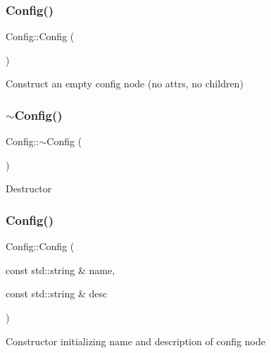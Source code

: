 \subsubsection{\texorpdfstring{Config()}{Config()}\hspace{0.1cm}{\footnotesize\ttfamily [1/2]}}
{\footnotesize\ttfamily Config\+::\+Config (\begin{DoxyParamCaption}{ }\end{DoxyParamCaption})}

Construct an empty config node (no attrs, no children) \mbox{\label{classtheoria_1_1config_1_1Config_a543dce59b66475c5108088ee4ce1cdfc}} 
\subsubsection{\texorpdfstring{$\sim$\+Config()}{~Config()}}
{\footnotesize\ttfamily Config\+::$\sim$\+Config (\begin{DoxyParamCaption}{ }\end{DoxyParamCaption})\hspace{0.3cm}{\ttfamily [virtual]}}

Destructor \mbox{\label{classtheoria_1_1config_1_1Config_a232146edc23baa804dbc82ffd3158f49}} 
\subsubsection{\texorpdfstring{Config()}{Config()}\hspace{0.1cm}{\footnotesize\ttfamily [2/2]}}
{\footnotesize\ttfamily Config\+::\+Config (\begin{DoxyParamCaption}\item[{const std\+::string \&}]{name,  }\item[{const std\+::string \&}]{desc }\end{DoxyParamCaption})\hspace{0.3cm}{\ttfamily [protected]}}

Constructor initializing name and description of config node 

